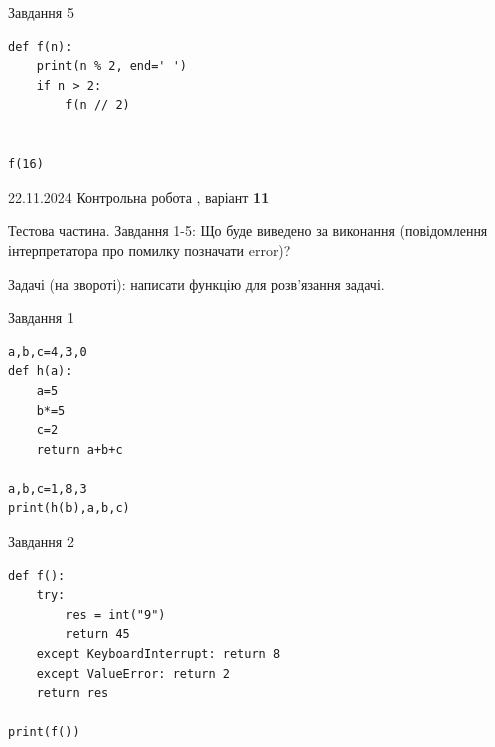 \documentclass[12pt, ukrainian]{article}
\begin{document}
{{{{{{{{{{\begin{minipage}[t]{10.7cm}
\vspace{5mm}
               
{\begin{center}Завдання {5}\end{center}}
\vspace{-6mm}

\begin{verbatim}
def f(n):
    print(n % 2, end=' ')
    if n > 2:
        f(n // 2)
    

f(16)
\end{verbatim}


\end{minipage}

\newpage

{{22.11.2024 Контрольна робота , варіант  \No \textbf { 11 }\par}}
{

Тестова частина. Завдання 1-5: Що буде виведено за виконання (повідомлення інтерпретатора про помилку позначати error)?

Задачі (на звороті): написати функцію для розв'язання задачі.

\vspace{5mm} \begin{minipage}[t]{8.5cm}
               
{\begin{center}Завдання {1}\end{center}}
\vspace{-6mm}

\begin{verbatim}
a,b,c=4,3,0
def h(a):
    a=5
    b*=5
    c=2
    return a+b+c

a,b,c=1,8,3
print(h(b),a,b,c)
\end{verbatim}


\vspace{5mm}
               
{\begin{center}Завдання {2}\end{center}}
\vspace{-6mm}

\begin{verbatim}
def f():
    try:
        res = int("9")
        return 45
    except KeyboardInterrupt: return 8
    except ValueError: return 2
    return res

print(f())
\end{verbatim}


\vspace{5mm}
               

\end{minipage}}}}}}}}}}}}
\end{document}
